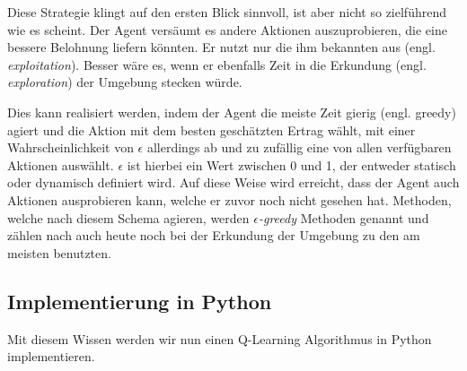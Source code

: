 Diese Strategie klingt auf den ersten Blick sinnvoll, ist aber nicht so zielführend wie es scheint. Der Agent versäumt es andere Aktionen auszuprobieren, die eine bessere Belohnung liefern könnten. Er nutzt nur die ihm bekannten aus (engl. \textit{exploitation}). Besser wäre es, wenn er ebenfalls Zeit in die Erkundung (engl. \textit{exploration}) der Umgebung stecken würde.

Dies kann realisiert werden, indem der Agent die meiste Zeit \glqq gierig\grqq{} (engl. greedy) agiert und die Aktion mit dem besten geschätzten Ertrag wählt, mit einer Wahrscheinlichkeit von $ \epsilon $ allerdings ab und zu zufällig eine von allen verfügbaren Aktionen auswählt. $ \epsilon $ ist hierbei ein Wert zwischen 0 und 1, der entweder statisch oder dynamisch definiert wird. Auf diese Weise wird erreicht, dass der Agent auch Aktionen ausprobieren kann, welche er zuvor noch nicht gesehen hat. Methoden, welche nach diesem Schema agieren, werden \textit{$ \epsilon $-greedy} Methoden genannt und zählen nach \cite{07_dabney2020temporallyextended} auch heute noch bei der Erkundung der Umgebung zu den am meisten benutzten.

\subsection{Implementierung in Python} \label{sec:qLearningImplementation}
Mit diesem Wissen werden wir nun einen Q-Learning Algorithmus in Python implementieren.


